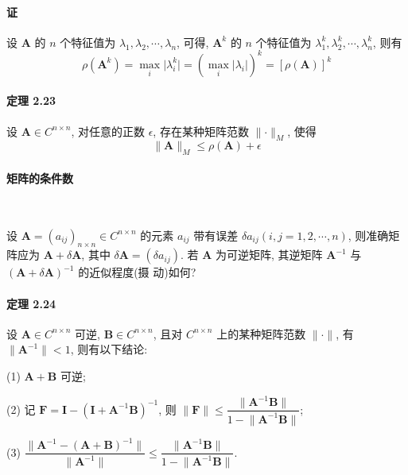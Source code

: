 \paragraph*{证} 设 $\bm{A}$ 的 $n$ 个特征值为 $\lambda_1, \lambda_2, \cdots, \lambda_n$, 可得, $\bm{A}^k$ 的 $n$ 个特征值为 $\lambda_1^k, \lambda_2^k, \cdots, \lambda_n^k$, 则有
$$
    \rho(\bm{A}^k) = \mathop{\max}\limits_i \lvert \lambda_i^k \rvert = (\mathop{\max}\limits_i \lvert \lambda_i \rvert)^k = [\rho(\bm{A})]^k
$$

\paragraph*{定理 2.23} 设 $\bm{A} \in C^{n\times n}$, 对任意的正数 $\epsilon$, 存在某种矩阵范数 $\lVert \bm{\cdot} \rVert _M$, 使得
$$
    \lVert \bm{A} \rVert _M \leqslant \rho(\bm{A}) + \epsilon
$$

\paragraph[]{矩阵的条件数} \

\par 设 $\bm{A} = (a_{ij})_{n\times n} \in C^{n\times n}$ 的元素 $a_{ij}$ 带有误差 $\delta a_{ij} (i, j = 1, 2, \cdots, n)$, 则准确矩阵应为
$\bm{A} + \delta\bm{A}$, 其中 $\delta\bm{A} = (\delta a_{ij})$. 若 $\bm{A}$ 为可逆矩阵, 其逆矩阵 $\bm{A}^{-1}$ 与 $(\bm{A} + \delta\bm{A})^{-1}$ 的近似程度(摄
动)如何?

\paragraph*{定理 2.24} 设 $\bm{A} \in C^{n\times n}$ 可逆, $\bm{B} \in C^{n\times n}$, 且对 $C^{n\times n}$ 上的某种矩阵范数 $\lVert \bm{\cdot} \rVert$, 有 $\lVert \bm{A}^{-1} \rVert < 1$,
则有以下结论:
\par (1) $\bm{A} + \bm{B}$ 可逆;
\par (2) 记 $\bm{F} = \bm{I} - (\bm{I} + \bm{A}^{-1}\bm{B})^{-1}$, 则 $\lVert \bm{F} \rVert \leqslant \dfrac{\lVert \bm{A}^{-1}\bm{B} \rVert}{1 - \lVert \bm{A}^{-1}\bm{B} \rVert}$;
\par (3) $\dfrac{\lVert \bm{A}^{-1} - (\bm{A} + \bm{B})^{-1} \rVert}{\lVert \bm{A}^{-1} \rVert} \leqslant \dfrac{\lVert \bm{A}^{-1}\bm{B} \rVert}{1 - \lVert \bm{A}^{-1}\bm{B} \rVert}$.

